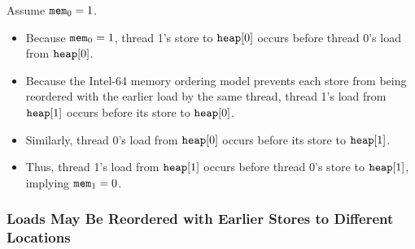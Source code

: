 \begin{table}[!hbt]
\noindent{}
\caption[Stores Are Not Reordered with Older Loads]{Stores Are Not Reordered with Older Loads \cite[Example 8-2]{ref:Intel}}
\label{tbl:litmus:intel:2}
\end{table}

\noindent
Assume $\texttt{mem}_0 = 1$.
\begin{itemize}
  \item Because $\texttt{mem}_0 = 1$, thread 1’s store to $\texttt{heap}[0]$ occurs before thread 0’s load from $\texttt{heap}[0]$.
  \item Because the Intel-64 memory ordering model prevents each store from being reordered with the earlier load by the same thread, thread 1’s load from $\texttt{heap}[1]$ occurs before its store to $\texttt{heap}[0]$.
  \item Similarly, thread 0’s load from $\texttt{heap}[0]$ occurs before its store to $\texttt{heap}[1]$.
  \item Thus, thread 1’s load from $\texttt{heap}[1]$ occurs before thread 0’s store to $\texttt{heap}[1]$, implying $\texttt{mem}_1 = 0$.
\end{itemize}

\newpage

\subsubsection*{Loads May Be Reordered with Earlier Stores to Different Locations}

